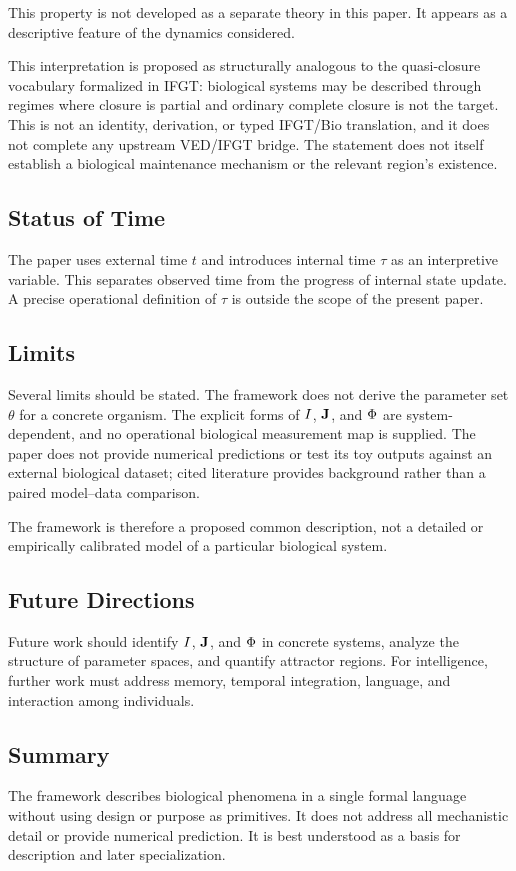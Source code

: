 This property is not developed as a separate theory in this paper. It appears as a descriptive feature of the dynamics considered.

This interpretation is proposed as structurally analogous to the quasi-closure vocabulary formalized in IFGT: biological systems may be described through regimes where closure is partial and ordinary complete closure is not the target. This is not an identity, derivation, or typed IFGT/Bio translation, and it does not complete any upstream VED/IFGT bridge. The statement does not itself establish a biological maintenance mechanism or the relevant region's existence.

\subsection{Status of Time}

The paper uses external time \(t\) and introduces internal time \(\tau\) as an interpretive variable. This separates observed time from the progress of internal state update. A precise operational definition of \(\tau\) is outside the scope of the present paper.

\subsection{Limits}

Several limits should be stated. The framework does not derive the parameter set \(\theta\) for a concrete organism. The explicit forms of \(I\), \(\mathbf{J}\), and \(\Phi\) are system-dependent, and no operational biological measurement map is supplied. The paper does not provide numerical predictions or test its toy outputs against an external biological dataset; cited literature provides background rather than a paired model--data comparison.

The framework is therefore a proposed common description, not a detailed or empirically calibrated model of a particular biological system.

\subsection{Future Directions}

Future work should identify \(I\), \(\mathbf{J}\), and \(\Phi\) in concrete systems, analyze the structure of parameter spaces, and quantify attractor regions. For intelligence, further work must address memory, temporal integration, language, and interaction among individuals.

\subsection{Summary}

The framework describes biological phenomena in a single formal language without using design or purpose as primitives. It does not address all mechanistic detail or provide numerical prediction. It is best understood as a basis for description and later specialization.
